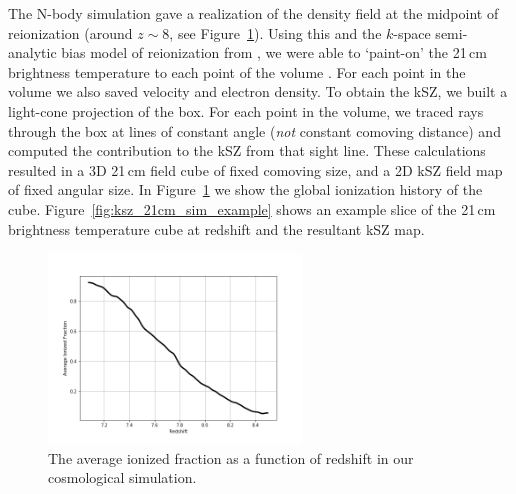 The N-body simulation gave a realization of the density field at the midpoint of reionization (around $z\sim 8$, see Figure~\ref{fig:ksz_21cm_sim_ionfrac_avg}). Using this and the $k$-space semi-analytic bias model of reionization from \cite{Battaglia.13}, we were able to `paint-on' the 21\,cm brightness temperature to each point of the volume \citep{LaPlante.14}. For each point in the volume we also saved velocity and electron density. To obtain the kSZ, we built a light-cone projection of the box. For each point in the volume, we traced rays through the box at lines of constant angle (\textit{not} constant comoving distance) and computed the contribution to the kSZ from that sight line. These calculations resulted in a 3D 21\,cm field cube of fixed comoving size, and a 2D kSZ field map of fixed angular size. In Figure~\ref{fig:ksz_21cm_sim_ionfrac_avg} we show the global ionization history of the cube. Figure~\ref{fig:ksz_21cm_sim_example} shows an example slice of the 21\,cm brightness temperature cube at redshift and the resultant kSZ map. 

\begin{figure}
\centering
\includegraphics[width=0.6\textwidth]{chapters/ksz_21cm/figures/smoothed_ionfrac.png}
\caption{The average ionized fraction as a function of redshift in our cosmological simulation.}
\label{fig:ksz_21cm_sim_ionfrac_avg}
\end{figure}

